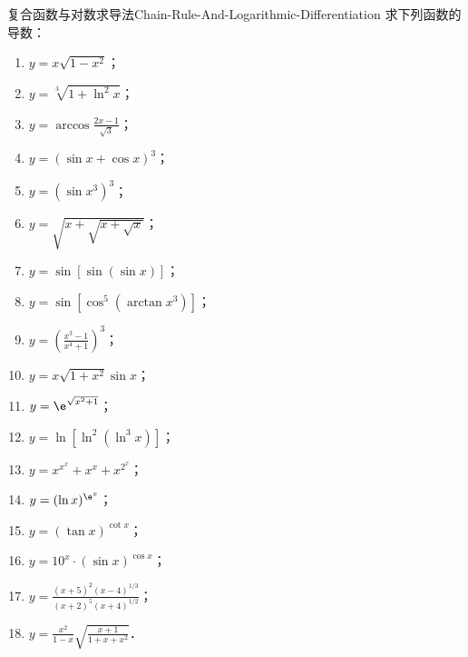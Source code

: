 \begin{problem}{复合函数与对数求导法}{Chain-Rule-And-Logarithmic-Differentiation}
    求下列函数的导数：
    \begin{enumerate}
        \item $y = x\sqrt{1-x^2}$；
        \item $y = \sqrt[3]{1+\ln^2 x}$；
        \item $y = \arccos \frac{2x-1}{\sqrt{3}}$；
        \item $y = (\sin x + \cos x)^3$；
        \item $y = (\sin x^3)^3$；
        \item $y = \sqrt{x+\sqrt{x+\sqrt{x}}}$；
        \item $y = \sin[\sin(\sin x)]$；
        \item $y = \sin[\cos^5(\arctan x^3)]$；
        \item $y = \left(\frac{x^3-1}{x^4+1}\right)^3$；
        \item $y = x\sqrt{1+x^2}\sin x$；
        \item $y = \e^{\sqrt{x^2+1}}$；
        \item $y = \ln[\ln^2(\ln^3 x)]$；
        \item $y = x^{x^x} + x^x + x^{2^x}$；
        \item $y = (\ln x)^{\e^x}$；
        \item $y = (\tan x)^{\cot x}$；
        \item $y = 10^x \cdot (\sin x)^{\cos x}$；
        \item $y = \frac{(x+5)^2(x-4)^{1/3}}{(x+2)^5(x+4)^{1/2}}$；
        \item $y = \frac{x^2}{1-x}\sqrt{\frac{x+1}{1+x+x^2}}$．
    \end{enumerate}
\end{problem}

